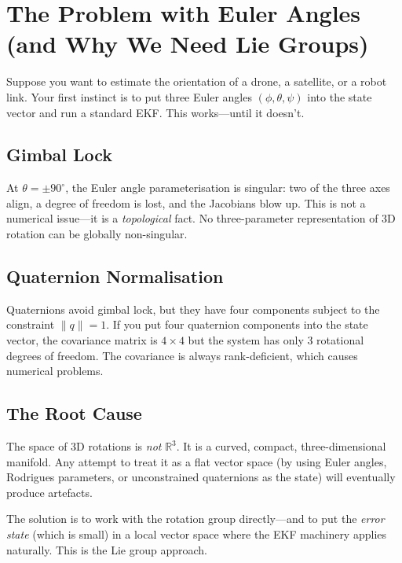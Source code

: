 \documentclass[11pt,letterpaper]{article}
\newcommand{\R}{\mathbb{R}}
\begin{document}
\newpage
\section{The Problem with Euler Angles\\(and Why We Need Lie Groups)}

Suppose you want to estimate the orientation of a drone, a
satellite, or a robot link.  Your first instinct is to put three
Euler angles $(\phi, \theta, \psi)$ into the state vector and run
a standard EKF.  This works---until it doesn't.

\subsection{Gimbal Lock}

At $\theta = \pm 90^{\circ}$, the Euler angle parameterisation is
singular: two of the three axes align, a degree of freedom is lost,
and the Jacobians blow up.  This is not a numerical issue---it is
a \emph{topological} fact.  No three-parameter representation of
3D rotation can be globally non-singular.

\subsection{Quaternion Normalisation}

Quaternions avoid gimbal lock, but they have four components subject
to the constraint $\|q\| = 1$.  If you put four quaternion
components into the state vector, the covariance matrix is
$4 \times 4$ but the system has only 3 rotational degrees of
freedom.  The covariance is always rank-deficient, which causes
numerical problems.

\subsection{The Root Cause}

The space of 3D rotations is \emph{not} $\R^{3}$.  It is a curved,
compact, three-dimensional manifold.  Any attempt to treat it as a
flat vector space (by using Euler angles, Rodrigues parameters,
or unconstrained quaternions as the state) will eventually produce
artefacts.

The solution is to work with the rotation group directly---and to
put the \emph{error state} (which is small) in a local vector
space where the EKF machinery applies naturally.  This is the Lie
group approach.
\end{document}
